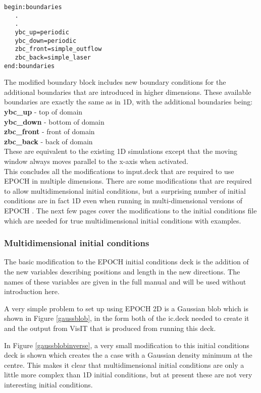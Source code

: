 \documentclass[12pt]{article}
\newcommand{\inlineemph}{\color{warwicklight} \bf}
\newcommand{\boxverbatim}[1]{\begin{Verbatim}[obeytabs=true,frame=single,
  framerule=0.5mm,rulecolor=\color{warwickmid},label=#1]}
\newcommand{\EPOCH}{{\color{warwickdark}\fontfamily{phv}\selectfont EPOCH} }
\begin{document}
\boxverbatim{Changed boundaries block}
begin:boundaries
   .
   .
   ybc_up=periodic
   ybc_down=periodic
   zbc_front=simple_outflow
   zbc_back=simple_laser
end:boundaries
\end{Verbatim}

The modified boundary block includes new boundary conditions for the additional
boundaries that are introduced in higher dimensions. These available boundaries
are exactly the same as in 1D, with the additional boundaries being:\\

{\inlineemph ybc\_up}    - top of domain\\
{\inlineemph ybc\_down}  - bottom of domain\\
{\inlineemph zbc\_front} - front of domain\\
{\inlineemph zbc\_back}  - back of domain\\

These are equivalent to the existing 1D simulations except that the moving
window always moves parallel to the x-axis when activated.\\ This concludes all
the modifications to input.deck that are required to use \EPOCH in multiple
dimensions. There are some modifications that are required to allow
multidimensional initial conditions, but a surprising number of initial
conditions are in fact 1D even when running in multi-dimensional versions of
\EPOCH. The next few pages cover the modifications to the initial conditions
file which are needed for true multidimensional initial conditions with
examples.

\subsubsection{Multidimensional initial conditions}

The basic modification to the EPOCH initial conditions deck is the addition of
the new variables describing positions and length in the new directions. The
names of these variables are given in the full manual and will be used without
introduction here.

A very simple problem to set up using EPOCH 2D is a Gaussian blob which is
shown in Figure \ref{gaussblob}, in the form both of the ic.deck needed to
create it and the output from VisIT that is produced from running this deck.

In Figure \ref{gaussblobinverse}, a very small modification to this initial
conditions deck is shown which creates the a case with a Gaussian density
minimum at the centre. This makes it clear that multidimensional initial
conditions are only a little more complex than 1D initial conditions, but at
present these are not very interesting initial conditions.
\end{document}
